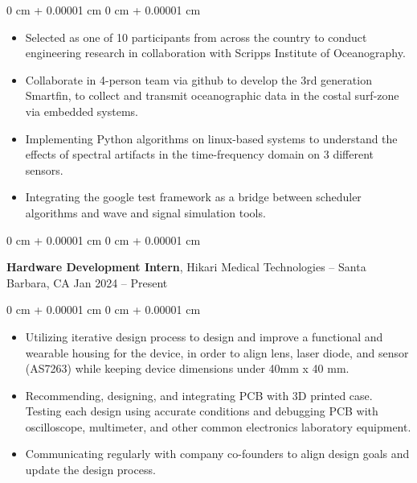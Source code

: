 \documentclass[10pt, letterpaper]{article}
\newenvironment{highlights}{
    \begin{itemize}[
        topsep=0.10 cm,
        parsep=0.10 cm,
        partopsep=0pt,
        itemsep=0pt,
        leftmargin=0 cm + 10pt
    ]
}{
    \end{itemize}
} %
\newenvironment{onecolentry}{
    \begin{adjustwidth}{
        0 cm + 0.00001 cm
    }{
        0 cm + 0.00001 cm
    }
}{
    \end{adjustwidth}
} %
\newenvironment{twocolentry}[2][]{
    \onecolentry
    \def\secondColumn{#2}
    \setcolumnwidth{\fill, 4.5 cm}
    \begin{paracol}{2}
}{
    \switchcolumn \raggedleft \secondColumn
    \end{paracol}
    \endonecolentry
} %
\begin{document}
    \vspace{0.1 cm}

    \begin{onecolentry}
        \begin{highlights}
            \item Selected as one of 10 participants from across the country to conduct engineering research in collaboration with Scripps Institute of Oceanography.
            \item Collaborate in 4-person team via github to develop the 3rd generation Smartfin, to collect and transmit oceanographic data in the costal surf-zone via embedded systems.
            \item Implementing Python algorithms on linux-based systems to understand the effects of spectral artifacts in the time-frequency domain on 3 different sensors. 
            \item Integrating the google test framework as a bridge between scheduler algorithms and wave and signal simulation tools.
        \end{highlights}
    \end{onecolentry}


    \vspace{0.2 cm}
    
    \begin{twocolentry}{
            Jan 2024 – Present
        }
            \textbf{Hardware Development Intern}, Hikari Medical Technologies -- Santa Barbara, CA\end{twocolentry}

        \vspace{0.10 cm}
        \begin{onecolentry}
            \begin{highlights}
                \item Utilizing iterative design process to design and improve a functional and wearable housing for the device, in order to align lens, laser diode, and sensor (AS7263) while keeping device dimensions under 40mm x 40 mm.
                \item Recommending, designing, and integrating PCB with 3D printed case. Testing each design using accurate conditions and debugging PCB with oscilloscope, multimeter, and other common electronics laboratory equipment.
                \item Communicating regularly with company co-founders to align design goals and update the design process.
            \end{highlights}
        \end{onecolentry}
\end{document}
